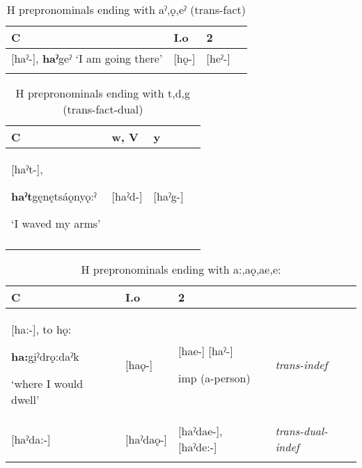 \lipsum[1-1]



\begin{table}
\caption{H prepronominals ending with aˀ,ǫ,eˀ (trans-fact)}
\label{tab:1:transfact}
\scriptsize{
\begin{tabularx}{\textwidth}{XXXX}
\lsptoprule
C & I.o & 2\\
\midrule
{}[haˀ{}-], \textbf{haˀ}geˀ ‘I am going there’ & [hǫ-] & [heˀ-]\\
\lspbottomrule
\end{tabularx}}
\end{table}


\begin{table}
\caption{H prepronominals ending with t,d,g (trans-fact-dual)}
\label{tab:1:transfactdual}
\scriptsize{
\begin{tabularx}{\textwidth}{XXXX}
\lsptoprule
C & w, V & y\\
\midrule
{}[haˀt-], 

\textbf{haˀt}gęnętsáǫnyǫ:ˀ 

‘I waved my arms’ & [haˀd-] & [haˀg-]\\
\lspbottomrule
\end{tabularx}}
\end{table}


\begin{table}
\caption{H prepronominals ending with a:,aǫ,ae,e:}
\label{tab:1:transdualindef}
\scriptsize{
\begin{tabularx}{\textwidth}{XXXX}
\lsptoprule
C & I.o & 2 & \\
\midrule
{}[ha:-], 
to hǫ: 

\textbf{ha:}gi̱ˀdrǫ:daˀk


‘where I would dwell’ & [haǫ-] & [hae-] [haˀ-] 

imp (a-person) & {\itshape trans-indef}\\
\midrule
{}[haˀda:-] & [haˀdaǫ-] & [haˀdae-], [haˀde:-] & {\itshape trans-dual-indef}\\
\lspbottomrule
\end{tabularx}}
\end{table}


